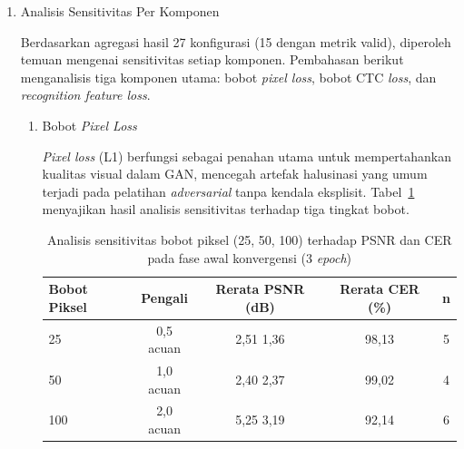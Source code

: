 \begin{enumerate}[leftmargin=1.5em, labelsep=0.5em, itemindent=0pt, label=\arabic*., topsep=0pt, partopsep=0pt]
    Catatan: Hasil PSNR dari \textit{grid search} (rentang 0,58--11,39 dB) tidak dapat dibandingkan langsung dengan pelatihan produksi (30,91 dB) karena perbedaan durasi pelatihan (3 berbanding 50 \textit{epoch}). Fokus analisis adalah pada tren relatif dan sensitivitas komponen.

    \item Analisis Sensitivitas Per Komponen
    
    Berdasarkan agregasi hasil 27 konfigurasi (15 dengan metrik valid), diperoleh temuan mengenai sensitivitas setiap komponen. Pembahasan berikut menganalisis tiga komponen utama: bobot \textit{pixel loss}, bobot CTC \textit{loss}, dan \textit{recognition feature loss}.

    \begin{enumerate}[leftmargin=1.5em, labelsep=0.5em, itemindent=0pt, topsep=0.5em, label=\alph*.]
        \item Bobot \textit{Pixel Loss}
        
        \textit{Pixel loss} (L1) berfungsi sebagai penahan utama untuk mempertahankan kualitas visual dalam GAN, mencegah artefak halusinasi yang umum terjadi pada pelatihan \textit{adversarial} tanpa kendala eksplisit. Tabel~\ref{tab:pixel-sensitivity} menyajikan hasil analisis sensitivitas terhadap tiga tingkat bobot.

        \begin{table}[!htbp]
            \caption[Sensitivitas bobot piksel]{Analisis sensitivitas bobot piksel (25, 50, 100) terhadap PSNR dan CER pada fase awal konvergensi (3 \textit{epoch})}
            \label{tab:pixel-sensitivity}
            \normalsize
            \begin{tabular}{lcccc}
                \hline
                \textbf{Bobot Piksel} & \textbf{Pengali}           & \textbf{Rerata PSNR (dB)}   & \textbf{Rerata CER (\%)} & \textbf{n} \\
                \hline
                25           & 0,5\texttimes{} acuan & 2,51 \textpm{} 1,36 & 98,13        & 5 \\
                50           & 1,0\texttimes{} acuan & 2,40 \textpm{} 2,37 & 99,02        & 4 \\
                100          & 2,0\texttimes{} acuan & 5,25 \textpm{} 3,19 & 92,14        & 6 \\
                \hline
            \end{tabular}
        \end{table}


\end{enumerate}
\end{enumerate}
